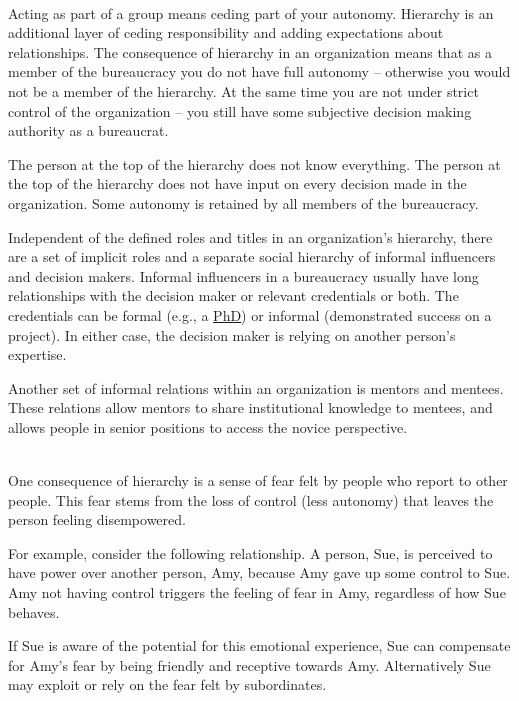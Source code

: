 \ \\

Acting as part of a group means ceding part of your autonomy. Hierarchy is an additional layer of ceding responsibility and adding expectations about relationships.
The consequence of hierarchy in an organization means that as a member of the bureaucracy you do not have full autonomy -- otherwise you would not be a member of the hierarchy. At the same time you are not under strict control of the organization -- you still have some subjective decision making authority as a bureaucrat.

The person at the top of the hierarchy does not know everything. The person at the top of the hierarchy does not have input on every decision made in the organization. Some autonomy is retained by all members of the bureaucracy.

Independent of the defined roles and titles in an organization's hierarchy, there are a set of implicit roles and a separate social hierarchy of informal influencers and decision makers. Informal influencers in a bureaucracy usually have long relationships with the decision maker or relevant credentials or both. The credentials can be formal (e.g., a \href{https://en.wikipedia.org/wiki/Doctor_of_Philosophy}{PhD}) or informal (demonstrated success on a project). In either case, the decision maker is relying on another person's expertise. 

Another set of informal relations within an organization is mentors and mentees. These relations allow mentors to share institutional knowledge to mentees, and allows people in senior positions to access the novice perspective. 


\ \\

One consequence of hierarchy is a sense of fear felt by people who report to other people. This fear stems from the loss of control (less autonomy) that leaves the person feeling disempowered. 

For example, consider the following relationship. A person, Sue, is perceived to have power over another person, Amy, because Amy gave up some control to Sue. Amy not having control triggers the feeling of fear in Amy, regardless of how Sue behaves. 

If Sue is aware of the potential for this emotional experience, Sue can compensate for Amy's fear by being friendly and receptive towards Amy. Alternatively Sue may exploit or rely on the fear felt by subordinates. 





